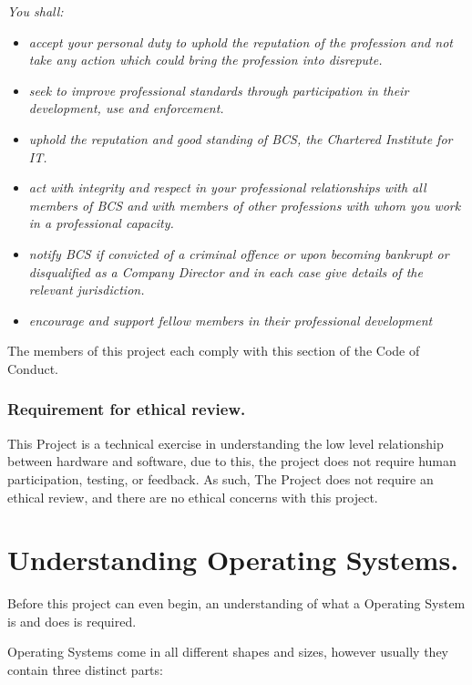 \documentclass[a4paper]{report}
\begin{document}
\textit{You shall:}
\begin{itemize}
\item \textit{accept your personal duty to uphold the reputation of the profession and not take any action which could bring the profession into disrepute.}
\item \textit{seek to improve professional standards through participation in their development, use and enforcement.}
\item \textit{uphold the reputation and good standing of BCS, the Chartered Institute for IT.}
\item \textit{act with integrity and respect in your professional relationships with all members of BCS and with members of other professions with whom you work in a professional capacity.}
\item \textit{notify BCS if convicted of a criminal offence or upon becoming bankrupt or disqualified as a Company Director and in each case give details of the relevant jurisdiction.}
\item \textit{encourage and support fellow members in their professional development}
\end{itemize}

The members of this project each comply with this section of the Code of Conduct.



\subsection*{Requirement for ethical review.}

This Project is a technical exercise in understanding the low level relationship between hardware and software, due to this, the project does not require human participation, testing, or feedback. As such, The Project does not require an ethical review, and there are no ethical concerns with this project.

\clearpage
\chapter*{Understanding Operating Systems.}


Before this project can even begin, an understanding of what a Operating System is and does is required.

Operating Systems come in all different shapes and sizes, however usually they contain three distinct parts:
\end{document}
